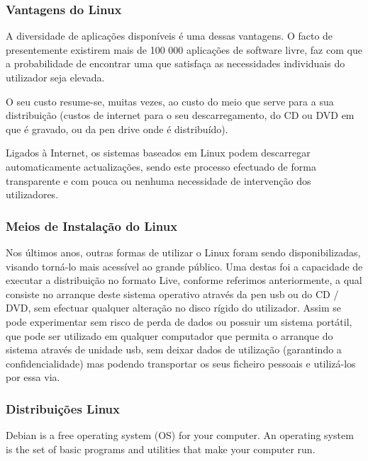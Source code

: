 \documentclass[
	article,			%
	12pt,				%
	openright,			%
	oneside,			%
	a4paper,			%
	chapter=TITLE,		%
	section=TITLE,		%
	subsection=TITLE,	%
	subsubsection=TITLE,%
	subsubsubsection=TITLE, %
	english,			%
	brazil,				%
	]{abntex2}
\begin{document}
\subsubsection{Vantagens do Linux}

A diversidade de aplicações disponíveis é uma dessas vantagens. O facto de presentemente existirem mais de 100 000 aplicações de software livre, faz com que a probabilidade de encontrar uma que satisfaça as necessidades individuais do utilizador seja elevada.

O seu custo resume-se, muitas vezes, ao custo do meio que serve para a sua distribuição (custos de internet para o seu descarregamento, do CD ou DVD em que é gravado, ou da pen drive onde é distribuído).

Ligados à Internet, os sistemas baseados em Linux podem descarregar automaticamente actualizações, sendo este processo efectuado de forma transparente e com pouca ou nenhuma necessidade de intervenção dos utilizadores.

\cite{Nunes2009}

\subsubsection{Meios de Instalação do Linux}

Nos últimos anos, outras formas de utilizar o Linux foram sendo disponibilizadas, visando torná-lo mais acessível ao grande público. Uma destas foi a capacidade de executar a distribuição no formato Live, conforme referimos anteriormente, a qual consiste no arranque deste sistema operativo através da pen usb ou do CD / DVD, sem efectuar qualquer alteração no disco rígido do utilizador. Assim se pode experimentar sem risco de perda de dados ou possuir um sistema portátil, que pode ser utilizado em qualquer computador que permita o arranque do sistema através de unidade usb, sem deixar dados de utilização (garantindo a confidencialidade) mas podendo transportar os seus ficheiro pessoais e utilizá-los por essa via.

\cite{Nunes2009}

\subsubsection{Distribuições Linux}

Debian is a free operating system (OS) for your computer. An operating system is the set of basic programs and utilities that make your computer run. 
\end{document}
